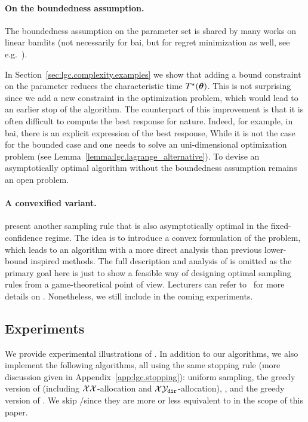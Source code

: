 \paragraph{On the boundedness assumption.}
The boundedness assumption on the parameter set is shared by many works on linear bandits (not necessarily for \gls{bai}, but for regret minimization as well, see e.g.~\citealt{abbasi-yadkori2011linear,soare2014linear}). 

In Section~\ref{sec:lgc.complexity.examples} we show that adding a bound constraint on the parameter reduces the characteristic time $T^{\star}({\boldsymbol \theta})$. This is not surprising since we add a new constraint in the optimization problem, which would lead to an earlier stop of the algorithm. The counterpart of this improvement is that it is often difficult to compute the best response for nature. Indeed, for example, in \gls{bai}, there is an explicit expression of the best response, While it is not the case for the bounded case and one needs to solve an uni-dimensional optimization problem (see Lemma~\ref{lemma:lgc.lagrange_alternative}). To devise an asymptotically optimal algorithm without the boundedness assumption remains an open problem.

\paragraph{A convexified variant.}
\cite{degenne2020game} present another sampling rule \LGC{} that is also asymptotically optimal in the fixed-confidence regime. The idea is to introduce a convex formulation of the problem, which leads to an algorithm with a more direct analysis than previous lower-bound inspired methods. The full description and analysis of \LGC{} is omitted as the primary goal here is just to show a feasible way of designing optimal sampling rules from a game-theoretical point of view. Lecturers can refer to~\cite{degenne2020game} for more details on \LGC{}. Nonetheless, we still include \LGC{} in the coming experiments.

\subsection{Experiments}\label{sec:lgc.game.experiments}

We provide experimental illustrations of \LG{}. In addition to our algorithms, we also implement the following algorithms, all using the same stopping rule (more discussion given in Appendix~\ref{app:lgc.stopping}): uniform sampling, the greedy version of \XYS (including $\mathcal{X}\mathcal{X}$-allocation and $\mathcal{X}\mathcal{Y}_{\texttt{dir}}$-allocation), \XYA, and the greedy version of \LGapE. We skip \GLUCB/\GLGapE since they are more or less equivalent to \LGapE in the scope of this paper.

